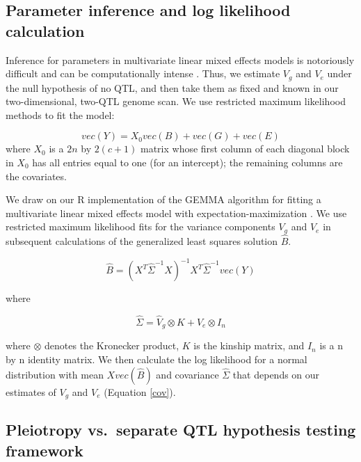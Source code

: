 \documentclass[oneside]{book}\usepackage[]{graphicx}\usepackage[]{color}
\begin{document}
\subsection{Parameter inference and log likelihood calculation}

Inference for parameters in multivariate linear mixed effects models
is notoriously difficult and can be computationally intense
\citep{meyer1989restricted,meyer1991estimating}. Thus, we estimate
$V_g$ and $V_e$ under the null hypothesis of no QTL, and then take
them as fixed and known in our two-dimensional, two-QTL genome scan.
We use restricted maximum likelihood methods to fit the
model:

\begin{equation}
vec(Y) = X_0vec(B) + vec(G) + vec(E)
\label{model}
\end{equation}
where $X_0$ is a $2n$ by $2(c + 1)$ matrix whose first column of each
diagonal block in $X_0$ has all entries equal to one (for an intercept); the remaining
columns are the covariates.

We draw on our R implementation \citep{gemma2} of the
GEMMA algorithm for fitting a multivariate linear mixed effects model
with expectation-maximization \citep{zhou2014efficient}. We use
restricted maximum likelihood fits for the variance components $V_g$
and $V_e$ in subsequent calculations of the generalized least squares
solution $\hat B$.

\begin{equation}
    \hat B = (X^T\hat\Sigma^{-1}X)^{-1}X^T\hat\Sigma^{-1}vec(Y)
\end{equation}

\noindent where

\begin{equation}
    \hat\Sigma = \hat V_g \otimes K + \hat V_e \otimes I_n
    \label{cov}
\end{equation}

\noindent where $\otimes$ denotes the Kronecker product, $K$ is the
kinship matrix, and $I_n$ is a n by n
identity matrix. We then calculate the log likelihood for a normal
distribution with mean $X vec(\hat B)$ and covariance $\hat \Sigma$
that depends on our estimates of $V_g$ and $V_e$ (Equation \ref{cov}).

\subsection{Pleiotropy vs.\ separate QTL hypothesis testing framework}
\end{document}
